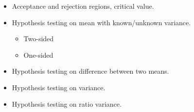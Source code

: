 \documentclass[a4paper]{article}
\begin{document}
\begin{enumerate}
\begin{itemize}
     \item Acceptance and rejection regions, critical value.
     
     \item Hypothesis testing on mean with known/unknown variance.
     \begin{itemize}
         \item Two-sided
         \item One-sided
     \end{itemize}
     
     \item Hypothesis testing on difference between two means.
     
     \item Hypothesis testing on variance.
     
     \item Hypothesis testing on ratio variance.
    
    
    
\end{itemize}













\end{enumerate}
\end{document}
